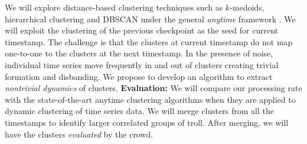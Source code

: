 We will explore distance-based clustering techniques such as $k$-medoids, hierarchical clustering and DBSCAN under the general {\it anytime} framework \cite{Zilberstein:96}. We will exploit the clustering of the previous checkpoint as the seed for current timestamp. The challenge is that the clusters at current timestamp do not map one-to-one to the clusters at the next timestamp. In the presence of noise, individual time series move frequently in and out of clusters creating trivial formation and disbanding. We propose to develop an algorithm to extract {\it nontrivial dynamics} of clusters. 
\textbf{Evaluation:} We will compare our processing rate with the state-of-the-art anytime clustering algorithms when they are applied to dynamic clustering of time series data. We will merge clusters from all the timestamps to identify larger correlated groups of troll. After merging, we will have the clusters {\it evaluated} by the crowd.


